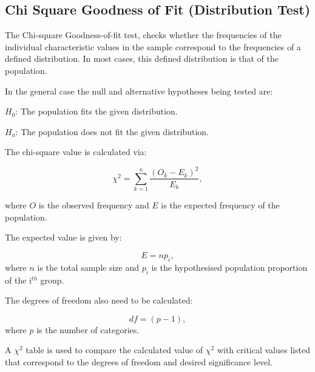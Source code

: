 \documentclass[
]{book}
\begin{document}
\hypertarget{chi-square-goodness-of-fit-distribution-test}{%
\subsection{Chi Square Goodness of Fit (Distribution Test)}\label{chi-square-goodness-of-fit-distribution-test}}

The Chi-square Goodness-of-fit test, checks whether the frequencies of the individual characteristic values in the sample correspond to the frequencies of a defined distribution. In most cases, this defined distribution is that of the population.

In the general case the null and alternative hypotheses being tested are:

\(H_0\): The population fits the given distribution.

\(H_a\): The population does not fit the given distribution.

The chi-square value is calculated via:

\[\chi^2=\sum_{k=1}^{n}\frac{(O_k-E_k)^2}{E_k},\]

where \(O\) is the observed frequency and \(E\) is the expected frequency of the population.

The expected value is given by:

\[E=np_i,\]
where \(n\) is the total sample size and \(p_i\) is the hypothesised population proportion of the i\(^{th}\) group.

The degrees of freedom also need to be calculated:

\[df=(p-1),\]
where \(p\) is the number of categories.

A \(\chi^2\) table is used to compare the calculated value of \(\chi^2\) with critical values listed that correspond to the degrees of freedom and desired significance level.
\end{document}
